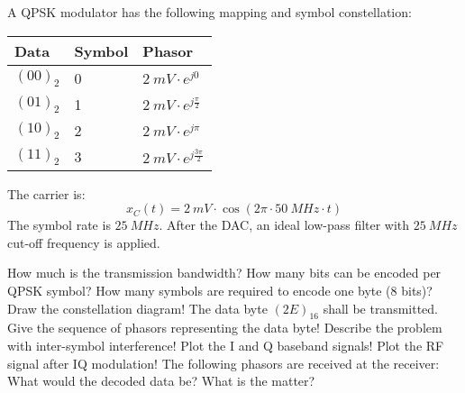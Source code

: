 \begin{solution}
	\begin{tasks}
	\end{tasks}
\end{solution}

\begin{question}[subtitle={Constellation diagrams}]
	A QPSK modulator has the following mapping and symbol constellation:
	\begin{table}[H]
		\centering
		\begin{tabular}{|l|l|l|}
			\hline
			Data & Symbol & Phasor \\
			\hline
			\hline
			$(00)_2$ & 0 & $\SI{2}{mV} \cdot e^{j 0}$ \\
			\hline
			$(01)_2$ & 1 & $\SI{2}{mV} \cdot e^{j \frac{\pi}{2}}$ \\
			\hline
			$(10)_2$ & 2 & $\SI{2}{mV} \cdot e^{j \pi}$ \\
			\hline
			$(11)_2$ & 3 & $\SI{2}{mV} \cdot e^{j \frac{3 \pi}{2}}$ \\
			\hline
		\end{tabular}
	\end{table}
	The carrier is:
	\begin{equation}
		x_C(t) = \SI{2}{mV} \cdot \cos\left(2\pi \cdot \SI{50}{MHz} \cdot t\right)
	\end{equation}
	The symbol rate is $\SI{25}{MHz}$. After the DAC, an ideal low-pass filter with $\SI{25}{MHz}$ cut-off frequency is applied.
	
	\begin{tasks}
		\task
		How much is the transmission bandwidth?
		\task
		How many bits can be encoded per QPSK symbol? How many symbols are required to encode one byte (8 bits)?
		\task
		Draw the constellation diagram!
		\task
		The data byte $(2E)_{16}$ shall be transmitted. Give the sequence of phasors representing the data byte!
		\task
		Describe the problem with inter-symbol interference!
		\task
		Plot the I and Q baseband signals! Plot the RF signal after IQ modulation!
		\task
		The following phasors are received at the receiver:
		\begin{equation}
			[\SI{1.5}{mV} e^{j \SI{120}{\degree}}, \SI{1.5}{mV} e^{j \SI{300}{\degree}}, \SI{1.5}{mV} e^{j \SI{30}{\degree}}, \SI{1.5}{mV} e^{j \SI{210}{\degree}}]
		\end{equation}
		What would the decoded data be? What is the matter?
	\end{tasks}
\end{question}

\begin{solution}
	\begin{tasks}
	\end{tasks}
\end{solution}

%
